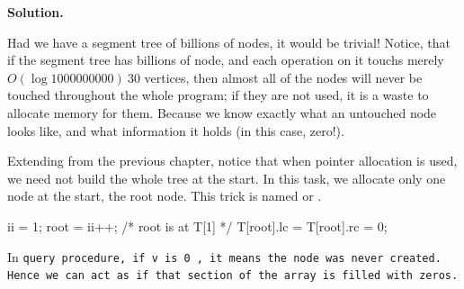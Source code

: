 \bf Solution.  \rm

Had we have a segment tree of billions of nodes, it would be trivial!
Notice, that if the segment tree has billions of node, and each operation on it touchs merely $O(\log 1000000000) ~ 30$ vertices, then almost all of the nodes will never be touched throughout the whole program; if they are not used, it is a waste to allocate memory for them.  Because we know exactly what an untouched node looks like, and what information it holds (in this case, zero!).

Extending from the previous chapter, notice that when pointer allocation is used, we need not build the whole tree at the start.
In this task, we allocate only one node at the start, the root node.  This trick is named  or .

\begtt
ii = 1;
root = ii++; /* root is at T[1] */
T[root].lc   =    T[root].rc = 0;
\endtt

In \tt query \rm procedure, if \tt v \rm is \tt 0 \rm, it means the node was never created.  Hence we can act as if that section of the array is filled with zeros.


